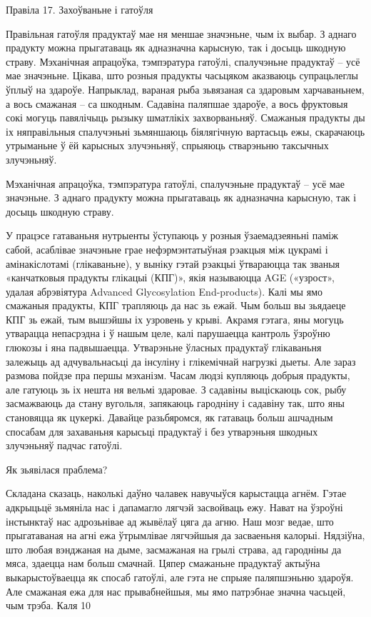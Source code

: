 Правіла 17. Захоўваньне і гатоўля

Правільная гатоўля прадуктаў мае ня меншае значэньне, чым іх выбар. З аднаго прадукту можна прыгатаваць як адназначна карысную, так і досыць шкодную страву. Мэханічная апрацоўка, тэмпэратура гатоўлі, спалучэньне прадуктаў – усё мае значэньне. Цікава, што розныя прадукты часьцяком аказваюць супрацьлеглы ўплыў на здароўе. Напрыклад, вараная рыба зьвязаная са здаровым харчаваньнем, а вось смажаная – са шкодным. Садавіна паляпшае здароўе, а вось фруктовыя сокі могуць павялічыць рызыку шматлікіх захворваньняў. Смажаныя прадукты ды іх няправільныя спалучэньні зьмяншаюць біялягічную вартасьць ежы, скарачаюць утрыманьне ў ёй карысных злучэньняў, спрыяюць стварэньню таксычных злучэньняў.

Мэханічная апрацоўка, тэмпэратура гатоўлі, спалучэньне прадуктаў – усё мае значэньне. З аднаго прадукту можна прыгатаваць як адназначна карысную, так і досыць шкодную страву.

У працэсе гатаваньня нутрыенты ўступаюць у розныя ўзаемадзеяньні паміж сабой, асаблівае значэньне грае нефэрмэнтатыўная рэакцыя між цукрамі і амінакіслотамі (глікаваньне), у выніку гэтай рэакцыі ўтвараюцца так званыя «канчатковыя прадукты глікацыі (КПГ)», якія называюцца AGE («узрост», удалая абрэвіятура Advanced Glycosylation End-products). Калі мы ямо смажаныя прадукты, КПГ трапляюць да нас зь ежай. Чым больш вы зьядаеце КПГ зь ежай, тым вышэйшы іх узровень у крыві. Акрамя гэтага, яны могуць утварацца непасрэдна і ў нашым целе, калі парушаецца кантроль ўзроўню глюкозы і яна падвышаецца. Утварэньне ўласных прадуктаў глікаваньня залежыць ад адчувальнасьці да інсуліну і глікемічнай нагрузкі дыеты. Але зараз размова пойдзе пра першы мэханізм.
Часам людзі купляюць добрыя прадукты, але гатуюць зь іх нешта ня вельмі здаровае. З садавіны выціскаюць сок, рыбу засмажваюць да стану вугольля, запякаюць гародніну і садавіну так, што яны становяцца як цукеркі. Давайце разьбяромся, як гатаваць больш ашчадным спосабам для захаваньня карысьці прадуктаў і без утварэньня шкодных злучэньняў падчас гатоўлі.

Як зьявілася праблема?

Складана сказаць, наколькі даўно чалавек навучыўся карыстацца агнём. Гэтае адкрыцьцё зьмяніла нас і дапамагло лягчэй засвойваць ежу. Нават на ўзроўні інстынктаў нас адрозьнівае ад жывёлаў цяга да агню. Наш мозг ведае, што прыгатаваная на агні ежа ўтрымлівае лягчэйшыя да засваеньня калорыі. Нядзіўна, што любая вэнджаная на дыме, засмажаная на грылі страва, ад гародніны да мяса, здаецца нам больш смачнай. Цяпер смажаньне прадуктаў актыўна выкарыстоўваецца як спосаб гатоўлі, але гэта не спрыяе паляпшэньню здароўя. Але смажаная ежа для нас прывабнейшыя, мы ямо патрэбнае значна часьцей, чым трэба. Каля 10%

